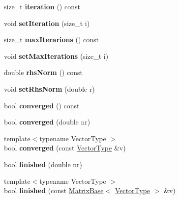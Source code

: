 \begin{DoxyCompactItemize}
size\+\_\+t {\bfseries iteration} () const
\item 
\mbox{\label{class_eigen_1_1_iteration_controller_accf6eba315d00a2db827c2fab2521dad}} 
void {\bfseries set\+Iteration} (size\+\_\+t i)
\item 
\mbox{\label{class_eigen_1_1_iteration_controller_a49c76e40ccfcf053e6be148abc8d27b4}} 
size\+\_\+t {\bfseries max\+Iterarions} () const
\item 
\mbox{\label{class_eigen_1_1_iteration_controller_ae9c85f641e476a3d0b7a8fc0befd3dee}} 
void {\bfseries set\+Max\+Iterations} (size\+\_\+t i)
\item 
\mbox{\label{class_eigen_1_1_iteration_controller_a1f61aa20c957a8f4a8a1f9d2d79c4b09}} 
double {\bfseries rhs\+Norm} () const
\item 
\mbox{\label{class_eigen_1_1_iteration_controller_a4aa73982fdd3a0549c4b04464e0f031c}} 
void {\bfseries set\+Rhs\+Norm} (double r)
\item 
\mbox{\label{class_eigen_1_1_iteration_controller_a723ae9cb3788b7fb34697b1f62741716}} 
bool {\bfseries converged} () const
\item 
\mbox{\label{class_eigen_1_1_iteration_controller_abd2f4666cc76e8afcd241eb482cb21e5}} 
bool {\bfseries converged} (double nr)
\item 
\mbox{\label{class_eigen_1_1_iteration_controller_a033e0322b6e5ad935388316cb1df95dc}} 
{\footnotesize template$<$typename Vector\+Type $>$ }\\bool {\bfseries converged} (const \hyperlink{struct_vector_type}{Vector\+Type} \&v)
\item 
\mbox{\label{class_eigen_1_1_iteration_controller_af58f849ee9625eeb99749478f17eb44b}} 
bool {\bfseries finished} (double nr)
\item 
\mbox{\label{class_eigen_1_1_iteration_controller_aa43c7653d26cdec6e6f4597e18bca1df}} 
{\footnotesize template$<$typename Vector\+Type $>$ }\\bool {\bfseries finished} (const \hyperlink{group___core___module_class_eigen_1_1_matrix_base}{Matrix\+Base}$<$ \hyperlink{struct_vector_type}{Vector\+Type} $>$ \&v)
\end{DoxyCompactItemize}
